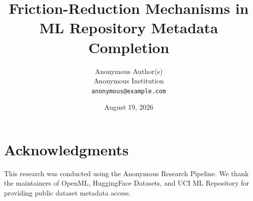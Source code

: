 \documentclass{article}
\title{Friction-Reduction Mechanisms in ML Repository Metadata Completion}
\author{
Anonymous Author(s) \\
Anonymous Institution \\
\texttt{anonymous@example.com}
}
\date{August 19, 2026}
\begin{document}
\maketitle











\section*{Acknowledgments}
This research was conducted using the Anonymous Research Pipeline. We thank the maintainers of OpenML, HuggingFace Datasets, and UCI ML Repository for providing public dataset metadata access.



\end{document}
